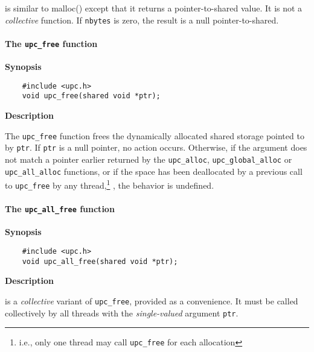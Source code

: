  is similar to malloc() except that it
    returns a pointer-to-shared value. It is not a {\em collective} function.
    If {\tt nbytes} is zero, the result is a null pointer-to-shared.

\cbstart
{}
\cbend

\paragraph{The {\tt upc\_free} function}

{\bf Synopsis} 

\npf\vspace{-2.5em}
\begin{verbatim}
    #include <upc.h> 
    void upc_free(shared void *ptr); 
\end{verbatim}

{\bf Description}

\np The {\tt upc\_free} function frees the dynamically
    allocated shared storage pointed to by {\tt ptr}.  If {\tt ptr} is
    a null pointer, no action occurs.  Otherwise, if the argument does
    not match a pointer earlier returned by the {\tt upc\_alloc},
    {\tt upc\_global\_alloc} or {\tt upc\_all\_alloc} functions,
    or if the space has been deallocated by a previous call
    to {\tt upc\_free} by any thread,\footnote{i.e., only one thread may call {\tt upc\_free} for
     each allocation} 
    , 
    the behavior is undefined.

\cbstart
\paragraph{The {\tt upc\_all\_free} function}

{\bf Synopsis} 

\npf\vspace{-2.5em}
\begin{verbatim}
    #include <upc.h> 
    void upc_all_free(shared void *ptr); 
\end{verbatim}

{\bf Description}

 is a {\em collective} variant of {\tt upc\_free}, provided as a convenience.
    It must be called collectively by all threads with the {\em single-valued} argument {\tt ptr}.

